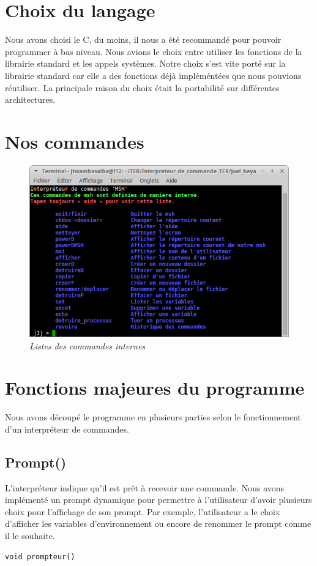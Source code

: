 \section{Choix du langage}
Nous avons choisi le C, du moins, il nous a été recommandé pour pouvoir programmer à bas niveau. Nous avions le choix entre utiliser les fonctions de la librairie standard et les appels systèmes. Notre choix s'est vite porté sur la librairie standard car elle a des fonctions déjà impléméntées que nous pouvions réutiliser. La principale raison du choix était la portabilité sur différentes architectures.
\section{Nos commandes}
\begin{figure}[h!]
\begin{center}
\centering \includegraphics[scale=0.70]{figure/com.png}
\caption{\it Listes des commandes internes}
\end{center}
\end{figure}

\section{Fonctions majeures du programme }
Nous avons découpé le programme en plusieurs parties selon le fonctionnement d'un interpréteur de commandes.
\subsection{Prompt()}
L'interpréteur indique qu'il est prêt à recevoir une commande.
Nous avons implémenté un prompt dynamique pour permettre à l'utilisateur d'avoir plusieurs choix pour l'affichage de son prompt. Par exemple, l'utilisateur a le choix d'afficher les variables d'environnement ou encore de renommer le prompt comme il le souhaite. 
\\
\begin{lstlisting}[frame=single]
void prompteur()
\end{lstlisting}

